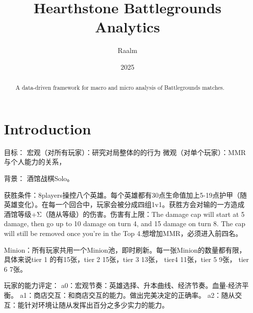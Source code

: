 \documentclass{article}
\title{Hearthstone Battlegrounds Analytics}
\author{Raalm}
\date{\Jul 3 2025}
\begin{document}
\maketitle

\begin{abstract}
A data-driven framework for macro and micro analysis of Battlegrounds matches.
\end{abstract}

\section{Introduction}
目标：
宏观（对所有玩家）：研究对局整体的的行为
微观（对单个玩家）：MMR与个人能力的关系，

背景：
酒馆战棋Solo。

获胜条件：8players操控八个英雄。每个英雄都有30点生命值加上5-19点护甲（随英雄变化）。在每一个回合中，玩家会被分成四组1v1。获胜方会对输的一方造成酒馆等级+Σ（随从等级）的伤害。伤害有上限：The damage cap will start at 5 damage, then go up to 10 damage on turn 4, and 15 damage on turn 8. The cap will still be removed once you’re in the Top 4.想增加MMR，必须进入前四名。

Minion：所有玩家共用一个Minion池，即时刷新。每一张Minion的数量都有限，具体来说tier 1 的有15张，tier 2 15张，tier 3 13张， tier4 11张，tier 5 9张， tier 6 7张。

玩家的能力评定：
a0：宏观节奏：英雄选择、升本曲线、经济节奏。血量-经济平衡。
a1：商店交互：和商店交互的能力。做出完美决定的正确率。
a2：随从交互：能针对环境让随从发挥出百分之多少实力的能力。
\end{document}
